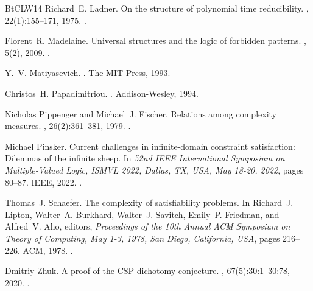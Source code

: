 \documentclass[10pt,a4paper]{amsart}
\theoremstyle{plain}
\theoremstyle{definition}
\numberwithin{equation}{section}
\begin{document}
\begin{thebibliography}{BtCLW14}
Richard~E. Ladner.
\newblock On the structure of polynomial time reducibility.
, 22(1):155--171, 1975.
\newblock \href {https://doi.org/10.1145/321864.321877} {}.

Florent~R. Madelaine.
\newblock Universal structures and the logic of forbidden patterns.
, 5(2), 2009.
\newblock \href {https://doi.org/10.2168/LMCS-5(2:13)2009} {}.

Y.~V. Matiyasevich.
.
\newblock The MIT Press, 1993.

Christos~H. Papadimitriou.
.
\newblock Addison-Wesley, 1994.

Nicholas Pippenger and Michael~J. Fischer.
\newblock Relations among complexity measures.
, 26(2):361--381, 1979.
\newblock \href {https://doi.org/10.1145/322123.322138} {}.

Michael Pinsker.
\newblock Current challenges in infinite-domain constraint satisfaction: Dilemmas of the infinite sheep.
\newblock In {\em 52nd {IEEE} International Symposium on Multiple-Valued Logic, {ISMVL} 2022, Dallas, TX, USA, May 18-20, 2022}, pages 80--87. {IEEE}, 2022.
\newblock \href {https://doi.org/10.1109/ISMVL52857.2022.00019} {}.

Thomas~J. Schaefer.
\newblock The complexity of satisfiability problems.
\newblock In Richard~J. Lipton, Walter~A. Burkhard, Walter~J. Savitch, Emily~P. Friedman, and Alfred~V. Aho, editors, {\em Proceedings of the 10th Annual {ACM} Symposium on Theory of Computing, May 1-3, 1978, San Diego, California, {USA}}, pages 216--226. {ACM}, 1978.
\newblock \href {https://doi.org/10.1145/800133.804350} {}.

Dmitriy Zhuk.
\newblock A proof of the {CSP} dichotomy conjecture.
, 67(5):30:1--30:78, 2020.
\newblock \href {https://doi.org/10.1145/3402029} {}.

\end{thebibliography}
\end{document}
